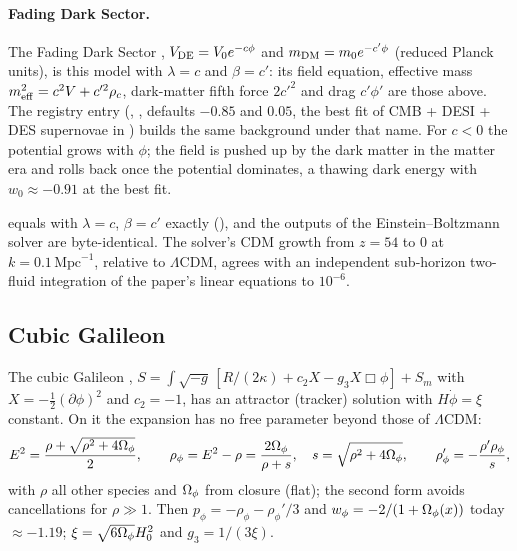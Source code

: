 \paragraph*{Fading Dark Sector.} The Fading Dark Sector \cite{ObiedVafaWu2026}, $V_{\rm DE}=V_0e^{-c\phi}$ and
$m_{\rm DM}=m_0e^{-c'\phi}$ (reduced Planck units), is this model with $\lambda=c$ and $\beta=c'$: its field equation,
effective mass $m_{\rm eff}^2=c^2V+c'^2\rho_c$, dark-matter fifth force $2c'^2$ and drag $c'\phi'$ are those above.
The registry entry  (, , defaults $-0.85$ and $0.05$, the
best fit of CMB + DESI + DES supernovae in \cite{ObiedVafaWu2026}) builds the same background under that name. For
$c<0$ the potential grows with $\phi$; the field is pushed up by the dark matter in the matter era and rolls back once
the potential dominates, a thawing dark energy with $w_0\approx-0.91$ at the best fit.
\begin{validation}
 equals  with $\lambda=c$, $\beta=c'$ exactly
(), and the outputs of the Einstein--Boltzmann solver are byte-identical. The
solver's CDM growth from $z=54$ to $0$ at $k=0.1\,\mathrm{Mpc}^{-1}$, relative to $\Lambda$CDM, agrees with an
independent sub-horizon two-fluid integration of the paper's linear equations to $10^{-6}$.
\end{validation}

\subsection{Cubic Galileon}

The cubic Galileon \cite{Deffayet2009,Barreira2013}, $S=\int\sqrt{-g}\,[R/(2\kappa)+c_2X-g_3X\Box\phi]+S_m$ with
$X=-\frac12(\partial\phi)^2$ and $c_2=-1$, has an attractor (tracker) solution with $H\dot\phi=\xi$ constant. On it the
expansion has no free parameter beyond those of $\Lambda$CDM:
\begin{equation}
E^2=\frac{\rho+\sqrt{\rho^2+4\Omega_\phi}}{2},\qquad \rho_\phi=E^2-\rho=\frac{2\Omega_\phi}{\rho+s},\quad
s=\sqrt{\rho^2+4\Omega_\phi},\qquad \rho_\phi'=-\frac{\rho'\rho_\phi}{s},
\end{equation}
with $\rho$ all other species and $\Omega_\phi$ from closure (flat); the second form avoids cancellations for
$\rho\gg1$. Then $p_\phi=-\rho_\phi-\rho_\phi'/3$ and $w_\phi=-2/(1+\Omega_\phi(x))$ today $\approx-1.19$; $\xi=
\sqrt{6\Omega_\phi}H_0^2$ and $g_3=1/(3\xi)$.

